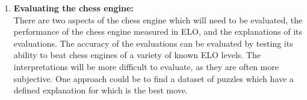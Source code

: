 \documentclass[12pt,a4paper]{article}
\begin{document}
\begin{enumerate}

    
    \item \textbf{Evaluating the chess engine:}
    \\There are two aspects of the chess engine which will need to be evaluated, the performance of the chess engine measured in ELO, and the explanations of its evaluations. The accuracy of the evaluations can be evaluated by testing its ability to beat chess engines of a variety of known ELO levels. The interpretations will be more difficult to evaluate, as they are often more subjective. One approach could be to find a dataset of puzzles which have a defined explanation for which is the best move.

\end{enumerate}
\end{document}
